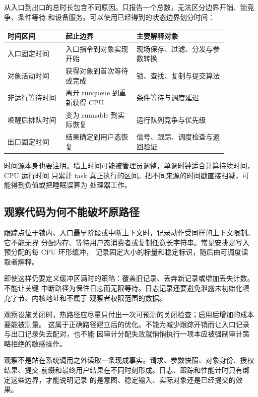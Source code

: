 从入口到出口的总时长包含不同原因。只报告一个总数，无法区分边界开销、锁竞争、条件等待
和设备服务。可以使用已经得到的状态边界划分时间：

\begin{longtable}{|L{0.23\linewidth}|L{0.29\linewidth}|L{0.36\linewidth}|}
\hline
时间区间 & 起止边界 & 主要解释对象 \\ \hline
入口固定时间 & 入口指令到对象实现开始 & 现场保存、过滤、分发与参数转换 \\ \hline
对象活动时间 & 获得对象到首次等待或完成 & 锁、查找、复制与提交算法 \\ \hline
非运行等待时间 & 离开 runqueue 到重新获得 CPU & 条件等待与调度延迟 \\ \hline
唤醒后排队时间 & 变为 runnable 到实际恢复 & 运行队列竞争与优先级 \\ \hline
出口固定时间 & 结果确定到用户态恢复 & 信号、跟踪、调度检查与返回验证 \\ \hline
\end{longtable}

时间源本身也要注明。墙上时间可能被管理员调整，单调时钟适合计算持续时间，CPU 运行时间
只累计 task 真正执行的区间。把不同来源的时间戳直接相减，可能得到负值或把睡眠误算为
处理器工作。

\subsection{观察代码为何不能破坏原路径}

跟踪点位于锁内、入口最早阶段或中断上下文时，记录动作受同样的上下文限制。它不能无界
分配内存、等待用户态消费者或复制任意长字符串。常见安排是写入预分配的每 CPU 环形缓冲，
记录固定大小的标量和稳定标识，随后由可调度读取者解释。

即使这样仍要定义缓冲区满时的策略：覆盖旧记录、丢弃新记录或增加丢失计数。不能让关键
中断路径为保住日志而无限等待。日志记录还要避免泄露未初始化填充字节、内核地址和不属于
观察者权限范围的数据。

观察设施关闭时，热路径应尽量只付出一次可预测的关闭检查；启用后增加的成本要能被测量。
这属于正确路径建立后的优化。不能为减少跟踪开销而让入口记录与出口记录失去配对，也不能
因审计分配失败就悄悄执行一项本应被强制审计策略拒绝的敏感操作。

\begin{keyidea}
观察不是站在系统调用之外读取一条现成事实。请求、参数快照、对象身份、授权结果、提交
前缀和最终用户结果在不同时刻形成。日志、跟踪和性能计时只有绑定这些边界，才能说明记录
的是意图、稳定输入、实际对象还是已经提交的效果。
\end{keyidea}

